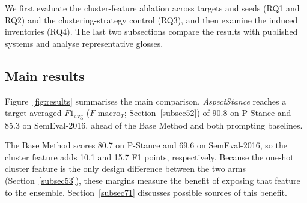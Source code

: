 \documentclass[pdflatex,sn-mathphys-num,iicol]{sn-jnl}%
\begin{document}
We first evaluate the cluster-feature ablation across targets and seeds (RQ1 and RQ2) and the clustering-strategy control (RQ3), and then examine the induced inventories (RQ4). The last two subsections compare the results with published systems and analyse representative glosses.

\subsection{Main results}\label{sec:main}

Figure~\ref{fig:results} summarises the main comparison. \textit{AspectStance} reaches a target-averaged \(F1_{\mathrm{avg}}\) (\(F\text{-}\mathrm{macro}_T\); Section~\ref{subsec52}) of 90.8 on P-Stance and 85.3 on SemEval-2016, ahead of the Base Method and both prompting baselines.

The Base Method scores 80.7 on P-Stance and 69.6 on SemEval-2016, so the cluster feature adds 10.1 and 15.7 F1 points, respectively. Because the one-hot cluster feature is the only design difference between the two arms (Section~\ref{subsec53}), these margins measure the benefit of exposing that feature to the ensemble. Section~\ref{subsec71} discusses possible sources of this benefit.
\end{document}
